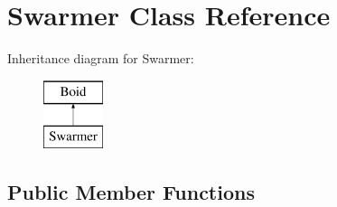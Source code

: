 \hypertarget{class_swarmer}{}\section{Swarmer Class Reference}
\label{class_swarmer}
Inheritance diagram for Swarmer\+:\begin{figure}[H]
\begin{center}
\leavevmode
\includegraphics[height=2.000000cm]{class_swarmer}
\end{center}
\end{figure}
\subsection*{Public Member Functions}
